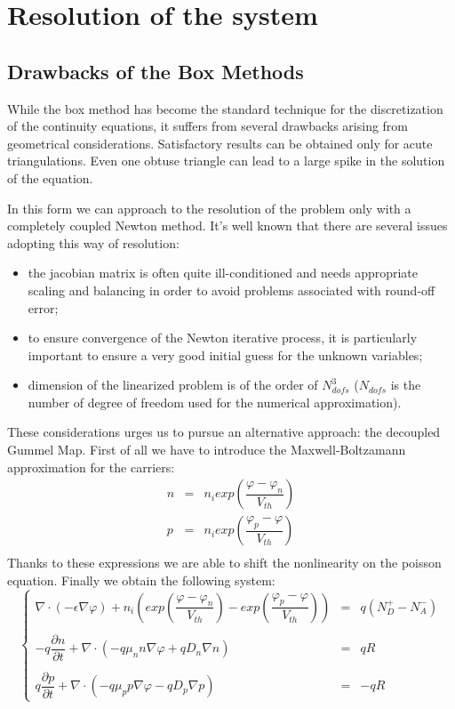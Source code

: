 \section{Resolution of the system}

\subsection{Drawbacks of the Box Methods}
While the box method has become the standard technique for the discretization of the continuity equations, it suffers from several drawbacks arising from geometrical considerations. Satisfactory results can be obtained only for acute triangulations. Even one obtuse triangle can lead to a large spike in the solution of the equation.

In this form we can approach to the resolution of the problem only with a completely coupled Newton method. It's well known that there are several issues adopting this way of resolution:
\begin{itemize}
\item the jacobian matrix is often quite ill-conditioned and needs appropriate scaling and balancing in order to avoid problems associated with round-off error;
\item to ensure convergence of the Newton iterative process, it is particularly important to ensure a very good initial guess for the unknown variables;
\item dimension of the linearized problem is of the order of $N_{dofs}^3$ ($N_{dofs}$ is the number of degree of freedom used for the numerical approximation).
\end{itemize}

These considerations urges us to pursue an alternative approach: the decoupled Gummel Map.
First of all we have to introduce the Maxwell-Boltzamann approximation for the carriers:
\begin{equation}
\begin{array}{rcl}
n&=&n_iexp\left(\dfrac{\varphi-\varphi_n}{V_{th}}\right) \\
p&=&n_iexp\left(\dfrac{\varphi_p-\varphi}{V_{th}} \right)\\
\end{array}
\end{equation} 
Thanks to these expressions we are able to shift the nonlinearity on the poisson equation. Finally we obtain the following system:
\begin{equation}
\label{eq: gummel map system}
\left\{
\begin{array}{rcl}
\nabla \cdot (-\epsilon \nabla \varphi) + n_i\left( exp\left(\dfrac{\varphi-\varphi_n}{V_{th}}\right) - exp\left(\dfrac{\varphi_p-\varphi}{V_{th}}\right) \right) & = & q(N_D^+-N_A^-) \\ \\
-q\dfrac{\partial n}{\partial t} + \nabla \cdot ( - q\mu_n n \nabla \varphi + qD_n \nabla n )& = & qR\\ \\
q\dfrac{\partial p}{\partial t} + \nabla \cdot (- q\mu_p p \nabla \varphi - qD_p \nabla p )& = & -qR
\end{array}
\right.
\end{equation}

